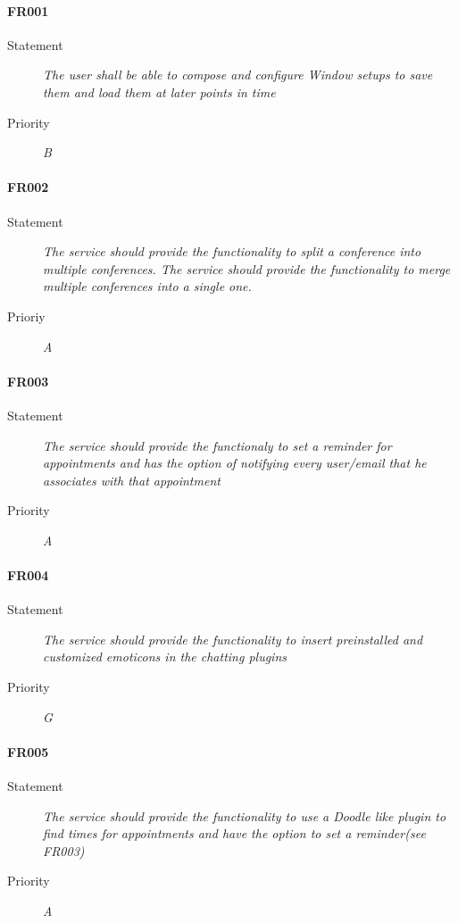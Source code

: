 \paragraph{FR001}
\begin{description}
  \item [Statement] 
    \textit{The user shall be able to compose and configure \gls{Window} setups to save them and load them at later points in time}
  \item [Priority] \textit{B}
\end{description}

\paragraph{FR002}
\begin{description}
  \item [Statement]
    \textit{The service should provide the functionality to split a conference into multiple conferences. The service should provide the functionality to merge multiple conferences into a single one.}
  \item [Prioriy] \textit{A}
\end{description}

\paragraph{FR003}
\begin{description}
  \item [Statement] 
    \textit{The service should provide the functionaly to set a reminder for appointments and has the option of notifying every user/email that he associates with that appointment}
  \item [Priority] \textit{A}
\end{description}

\paragraph{FR004}
\begin{description}
  \item [Statement] 
    \textit{The service should provide the functionality to insert preinstalled and customized emoticons in the chatting plugins}
  \item [Priority] \textit{G}
\end{description}

\paragraph{FR005}
\begin{description}
  \item [Statement] 
    \textit{The service should provide the functionality to use a Doodle like plugin to find times for appointments and have the option to set a reminder(see FR003)}
  \item [Priority] \textit{A}
\end{description}

